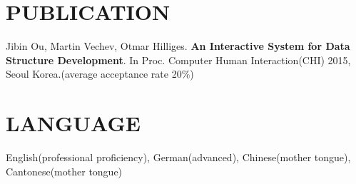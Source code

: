 \documentclass[margin, 10pt]{res} %
\begin{document}
\begin{resume}
\begin{CJK}{UTF8}{gbsn}


\section{PUBLICATION} 
Jibin Ou, Martin Vechev, Otmar Hilliges. \textbf{An Interactive System for Data Structure Development}.
In Proc. Computer Human Interaction(CHI) 2015, Seoul Korea.(average acceptance rate 20\%)


\section{LANGUAGE}
English(professional proficiency), German(advanced), Chinese(mother tongue), Cantonese(mother tongue)



\end{CJK}
\end{resume}
\end{document}
